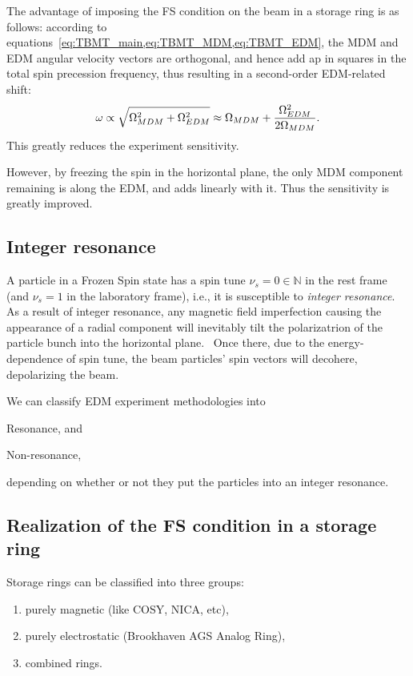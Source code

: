 \documentclass{article}
\begin{document}
The advantage of imposing the FS condition on the beam in a storage ring is as follows: according to equations~\cref{eq:TBMT_main,eq:TBMT_MDM,eq:TBMT_EDM}, the MDM and EDM angular velocity vectors are orthogonal, and hence add ap in squares in the total spin precession frequency, thus resulting in a second-order EDM-related shift:~\cite[p. 5]{Mane:SpinWheel}
\[
\omega \propto \sqrt{\Omega_{MDM}^2 + \Omega_{EDM}^2} \approx \Omega_{MDM} + \frac{\Omega_{EDM}^2}{2\Omega_{MDM}}.
\]
This greatly reduces the experiment sensitivity.

However, by freezing the spin in the horizontal plane, the only MDM component remaining is along the EDM, and adds linearly with it. Thus the sensitivity is greatly improved.

\subsection{Integer resonance}
A particle in a Frozen Spin state has a spin tune $\nu_s = 0 \in \mathbb{N}$ in the rest frame (and $\nu_s = 1$ in the laboratory frame), i.e., it is susceptible to \emph{integer resonance}.~\cite{COSY:ImperfectionResonance} As a result of integer resonance, any magnetic field imperfection causing the appearance of a radial component will inevitably tilt the polarizatrion of the particle bunch into the horizontal plane.~\cite[p. 8]{COSY:ImperfectionResonance} Once there, due to the energy-dependence of spin tune, the beam particles' spin vectors will decohere, depolarizing the beam. %

We can classify EDM experiment methodologies into
\begin{inparaenum}[1)]
\item Resonance, and
\item Non-resonance,
\end{inparaenum}
depending on whether or not they put the particles into an integer resonance.

\subsection{Realization of the FS condition in a storage ring}
Storage rings can be classified into three groups:
\begin{enumerate}
\item purely magnetic (like COSY, NICA, etc),
\item purely electrostatic (Brookhaven AGS Analog Ring),
\item combined rings.
\end{enumerate}
\end{document}
